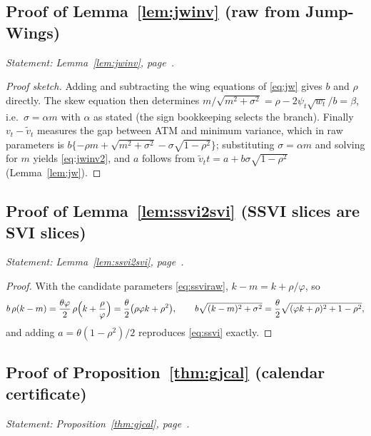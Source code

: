 \subsection{Proof of Lemma~\ref{lem:jwinv} (raw from Jump-Wings)}
\label{proof:jwinv}

\noindent\emph{Statement: Lemma~\ref{lem:jwinv}, page~\pageref{lem:jwinv}.}\medskip

\begin{proof}[Proof sketch]
Adding and subtracting the wing equations of \eqref{eq:jw} gives $b$ and $\rho$ directly. The
skew equation then determines $m/\sqrt{m^2+\sigma^2}=\rho-2\psi_t\sqrt{w_t}/b=\beta$, i.e.\
$\sigma=\alpha m$ with $\alpha$ as stated (the sign bookkeeping selects the branch). Finally
$v_t-\tilde v_t$ measures the gap between ATM and minimum variance, which in raw parameters is
$b\{-\rho m+\sqrt{m^2+\sigma^2}-\sigma\sqrt{1-\rho^2}\}$; substituting $\sigma=\alpha m$ and
solving for $m$ yields \eqref{eq:jwinv2}, and $a$ follows from
$\tilde v_tt=a+b\sigma\sqrt{1-\rho^2}$ (Lemma~\ref{lem:jw}).
\end{proof}

\subsection{Proof of Lemma~\ref{lem:ssvi2svi} (SSVI slices are SVI slices)}
\label{proof:ssvi2svi}

\noindent\emph{Statement: Lemma~\ref{lem:ssvi2svi}, page~\pageref{lem:ssvi2svi}.}\medskip

\begin{proof}
With the candidate parameters \eqref{eq:ssviraw}, $k-m=k+\rho/\varphi$, so
\[
b\,\rho(k-m)=\frac{\theta\varphi}{2}\,\rho\Bigl(k+\frac{\rho}{\varphi}\Bigr)
=\frac{\theta}{2}\bigl(\rho\varphi k+\rho^2\bigr),\qquad
b\sqrt{(k-m)^2+\sigma^2}
=\frac{\theta}{2}\sqrt{(\varphi k+\rho)^2+1-\rho^2},
\]
and adding $a=\theta(1-\rho^2)/2$ reproduces \eqref{eq:ssvi} exactly.
\end{proof}

\subsection{Proof of Proposition~\ref{thm:gjcal} (calendar certificate)}
\label{proof:gjcal}

\noindent\emph{Statement: Proposition~\ref{thm:gjcal}, page~\pageref{thm:gjcal}.}\medskip

